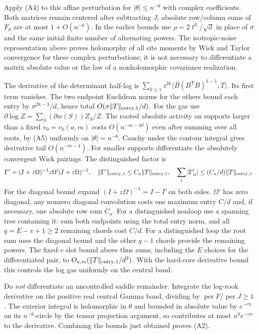Apply (A4) to this affine perturbation for $|\theta|\le n^{-6}$ with complex coefficients. Both matrices remain centered after subtracting $J$; absolute row/column sums of $F_\theta$ are at most $1+O(n^{-6})$. In the earlier bounds use $\rho=2\ell^3/\sqrt d$ in place of $\sigma$ and the same initial finite number of alternating powers. The isotropic-noise representation above proves holomorphy of all site moments by Wick and Taylor convergence for these complex perturbations; it is not necessary to differentiate a matrix absolute value or the law of a nonholomorphic covariance realization.

The derivative of the determinant half-log is
$\sum_{k\ge1}z^{2k}\langle B(B^{\mathsf T}B)^{k-1},T\rangle$.
Its first term vanishes. The two endpoint Euclidean norms for the others bound each entry by $\sigma^{2k-3}/d$, hence total $O(\sigma\|T\|_{\rm entry,1}/d)$. For the gas use
$\partial\log Z=\sum_S (\partial w(S)) Z_{\bar S}/Z$. The rooted absolute activity on supports larger than a fixed $v_0=v_0(a,m)$ costs $O(n^{-m-10})$ even after summing over all roots, by (A5) uniformly on $|\theta|=n^{-6}$. Cauchy under the contour integral gives derivative tail $O(n^{-m-4})$. For smaller supports differentiate the absolutely convergent Wick pairings. The distinguished factor is
\[
 \Gamma'=(I+z\Omega)^{-1}z\Omega'(I+z\Omega)^{-1},
 \quad \|\Gamma'\|_{\rm entry,1}\le C_a\|T\|_{\rm entry,1},
 \quad \sum_i|\Gamma'_{ii}|\le (C_a/d)\|T\|_{\rm entry,1}.
\]
For the diagonal bound expand $(I+z\Omega)^{-1}=I-\Gamma$ on both sides. $\Omega'$ has zero diagonal; any nonzero diagonal convolution costs one maximum entry $C/d$ and, if necessary, one absolute row sum $C_a$. For a distinguished nonloop use a spanning tree containing it: sum both endpoints using the total entry norm, and all $q=E-v+1\ge2$ remaining chords cost $C/d$. For a distinguished loop the root sum uses the diagonal bound and the other $q-1$ chords provide the remaining powers. The fixed-$v$ slot bound above thus sums, including the $E$ choices for the differentiated pair, to $O_{a,m}(\|T\|_{\rm entry,1}/d^2)$. With the hard-core derivative bound this controls the log gas uniformly on the central band.

Do \emph{not} differentiate an uncontrolled saddle remainder. Integrate the log-rook derivative on the positive real central Gamma band, dividing by $\operatorname{per}F/\operatorname{per}J\ge1$. The exterior integral is holomorphic in $\theta$ and bounded in absolute value by $e^{-cn}$ on its $n^{-6}$-circle by the tensor projection argument, so contributes at most $n^6e^{-cn}$ to the derivative. Combining the bounds just obtained proves (A2).

